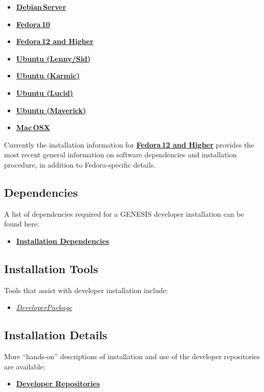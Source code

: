 \documentclass[12pt]{article}
\begin{document}
\begin{itemize}
   \item[]\href{../installation-debian-server/installation-debian-server.tex}{\bf Debian\,Server}
   \item[]\href{../installation-fedora10/installation-fedora10.tex}{\bf Fedora\,10}
   \item[]\href{../installation-fedora12/installation-fedora12.tex}{\bf Fedora\,12 and Higher}
   \item[]\href{../installation-ubuntu-lennysid/installation-ubuntu-lennysid.tex}{\bf Ubuntu (Lenny/Sid)}
   \item[]\href{../installation-ubuntu-karmic/installation-ubuntu-karmic.tex}{\bf Ubuntu (Karmic)}
   \item[]\href{../installation-ubuntu-lucid/installation-ubuntu-lucid.tex}{\bf Ubuntu (Lucid)}
   \item[]\href{../installation-ubuntu-maverick/installation-ubuntu-maverick.tex}{\bf Ubuntu (Maverick)}
   \item[]\href{../installation-osx/installation-osx.tex}{\bf Mac\,OSX}
\end{itemize}

Currently the installation information for
\href{../installation-fedora12/installation-fedora12.tex} {\bf
  Fedora\,12 and Higher} provides the most recent general information
on software dependencies and installation procedure, in addition to
Fedora-specific details.

\subsection*{Dependencies}
A list of dependencies required for a GENESIS developer installation can be found here:
\begin{itemize}
   \item[]\href{../genesis-dependencies/genesis-dependencies.tex}{\bf Installation Dependencies}
\end{itemize}

\subsection*{Installation Tools}
Tools that assist with developer installation include:
\begin{itemize}
   \item[]\href{../developer-package/developer-package.tex}{\it DeveloperPackage}
\end{itemize}

\subsection*{Installation Details}
More ``hands-on'' descriptions of installation and use of the developer repositories are available:
\begin{itemize}
   \item[]\href{../developer-repository/developer-repository.tex}{\bf Developer Repositories}
\end{itemize}
\end{document}
